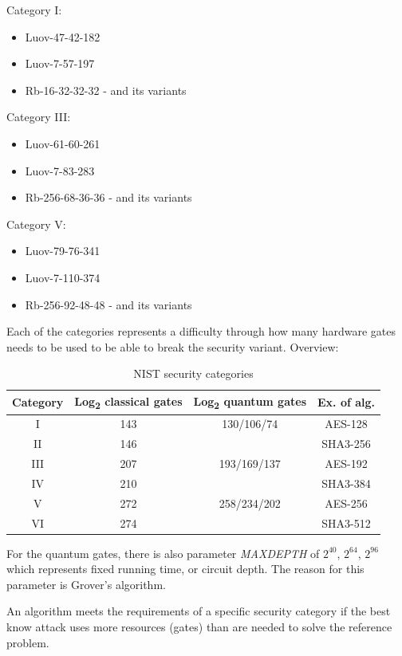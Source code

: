 \documentclass[thesis=M,english]{FITthesis}[2019/12/23]
\begin{document}
\bigskip
\noindent
Category I:
\begin{itemize}
\item Luov-47-42-182
\item Luov-7-57-197
\item Rb-16-32-32-32 - and its variants
\end{itemize}

\noindent
Category III:
\begin{itemize}
\item Luov-61-60-261
\item Luov-7-83-283
\item Rb-256-68-36-36 - and its variants
\end{itemize}

\noindent
Category V:
\begin{itemize}
\item Luov-79-76-341
\item Luov-7-110-374
\item Rb-256-92-48-48 - and its variants
\end{itemize}

\noindent
Each of the categories represents a difficulty through how many hardware gates needs to be used to be able to break the security variant.\cite{L-NIST-STANDARD} Overview:
\begin{table}[H]
\centering
\begin{tabular}{|c|c|c|c|}
\hline
Category & Log\textsubscript{2} classical gates & Log\textsubscript{2} quantum gates & Ex. of alg.\\ \hline
I & 143 & 130/106/74 & AES-128 \\ \hline
II & 146 & & SHA3-256 \\ \hline
III & 207 & 193/169/137 & AES-192 \\ \hline
IV & 210 & & SHA3-384 \\ \hline
V & 272 & 258/234/202 & AES-256 \\ \hline
VI & 274 & & SHA3-512 \\ \hline
\end{tabular}
\caption{NIST security categories}
\end{table}

\noindent
For the quantum gates, there is also parameter \textit{MAXDEPTH} of $2^{40}$, $2^{64}$, $2^{96}$ which represents fixed running time, or circuit depth. The reason for this parameter is Grover’s algorithm.

\bigskip
\noindent
An algorithm meets the requirements of a specific security category if the best know attack uses more resources (gates) than are needed to solve the reference problem.
\end{document}
